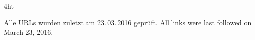 \documentclass[
               fontsize=12pt, %
               paper=a4,
               oneside, %
               BCOR=3mm, %
               DIV=13,   %
               headinclude=true,
               footinclude=false,
               bibliography=totoc,
               headsepline,
               cleardoublepage=empty,
               parskip=half,
               final   %
               ]{scrbook}
\let\ifdeutsch\iftrue
\begin{document}


\endgroup

\cleardoublepage

\iftex4ht
\else
\fi



\renewcommand*{\chapterpagestyle}{scrplain}
\pagestyle{scrheadings}

%
%
%











%
%
\appendix
%



\ifdeutsch
Alle URLs wurden zuletzt am 23.\,03.\,2016 geprüft.
\else
All links were last followed on March 23, 2016.
\fi

\pagestyle{empty}
\renewcommand*{\chapterpagestyle}{empty}
\Versicherung
\end{document}
